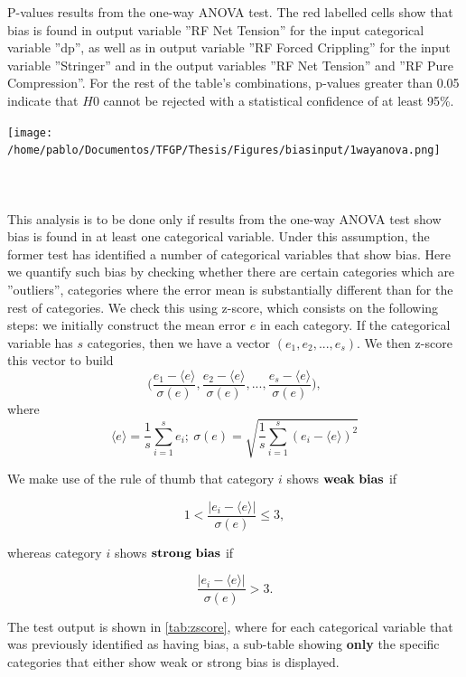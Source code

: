 \begin{table}
	\centering
	\caption{P-values results from the one-way ANOVA test. The red labelled cells show that bias is found in output variable ''RF Net Tension'' for the input categorical variable ''dp'', as well as in output variable ''RF Forced Crippling'' for the input variable ''Stringer'' and in the output variables ''RF Net Tension'' and ''RF Pure Compression''. For the rest of the table's combinations, p-values greater than 0.05 indicate that $H0$ cannot be rejected with a statistical confidence of at least 95\%.}
	\texttt{[image: /home/pablo/Documentos/TFGP/Thesis/Figures/biasinput/1wayanova.png]}
	\label{tab:1anova}
\end{table}
\FloatBarrier
%
\paragraph{ \\}
This analysis is to be done only if results from the one-way ANOVA test show bias is found in at least one categorical variable. Under this assumption, the former test has identified a number of categorical variables that show bias. Here we quantify such bias by checking whether there are certain categories which are ''outliers'', \ie categories where the error mean is substantially different than for the rest of categories. We check this using z-score\cite{kirkwood2010essential}, which consists on the following steps: we initially construct the mean error $e$ in each category. If the categorical variable has $s$ categories, then we have a vector $(e_1,e_2,...,e_s)$. We then z-score this vector to build
$$\bigg(\frac{e_1-\langle e \rangle}{\sigma(e)},\frac{e_2-\langle e \rangle}{\sigma(e)},...,\frac{e_s-\langle e \rangle}{\sigma(e)}\bigg),$$
where 
$$\langle e \rangle = \frac{1}{s}\sum_{i=1}^s e_i; \ \sigma(e)=\sqrt{\frac{1}{s}\sum_{i=1}^s (e_i-\langle e\rangle)^2}$$

We make use of the rule of thumb that category $i$ shows ${\bf weak\ bias}$ if

$$1<\frac{|e_i-\langle e \rangle|}{\sigma(e)}\leq3,$$

whereas category $i$ shows ${\bf strong\ bias}$ if 

$$\frac{|e_i-\langle e \rangle|}{\sigma(e)}>3.$$


The test output is shown in \autoref{tab:zscore}, where for each categorical variable that was previously identified as having bias, a sub-table showing \textbf{only} the specific categories that either show weak or strong bias is displayed.


